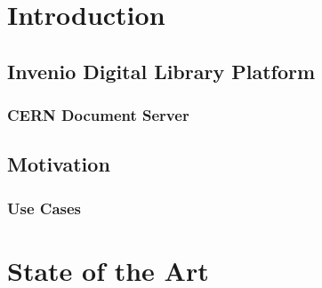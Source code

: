 \documentclass[12pt,a4paper]{report}
\begin{document}

  

  

  \begin{abstract}
    
  \end{abstract}

  \cleardoublepage

  \tableofcontents
  \listoffigures

  \cleardoublepage


  \chapter{Introduction}
    \label{sec:intro}

    \section{Invenio Digital Library Platform}
      \label{sec:invenio}
      

      \newpage

      \subsection{CERN Document Server}
        \label{sec:cds}
        

    \section{Motivation}
      \label{sec:motiv}
        

      \subsection{Use Cases}
        \label{sec:usecases}
        

  \cleardoublepage

  \chapter{State of the Art}
    \label{sec:soa}
    
\end{document}

